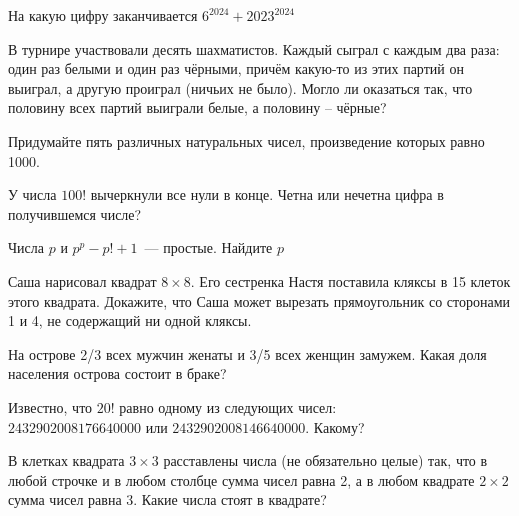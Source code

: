\documentclass{article}
\begin{document}
\begin{enumerate_boxed}
        \item На какую цифру заканчивается $6^{2024} + 2023^{2024}$

        \item В турнире участвовали десять шахматистов.
        Каждый сыграл с каждым два раза: один раз белыми и один раз чёрными, причём какую-то из этих партий он выиграл, а другую проиграл (ничьих не было).
        Могло ли оказаться так, что половину всех партий выиграли белые, а половину – чёрные?

        \item Придумайте пять различных натуральных чисел, произведение которых равно 1000.

        \item У числа $100!$ вычеркнули все нули в конце.
        Четна или нечетна цифра в получившемся числе?

        \item Числа $p$ и $p^p - p! + 1$~--- простые.
        Найдите $p$

        \item Саша нарисовал квадрат $8\times 8$.
        Его сестренка Настя поставила кляксы в 15 клеток этого квадрата.
        Докажите, что Саша может вырезать прямоугольник со сторонами 1 и 4, не содержащий ни одной кляксы.

        \item На острове 2/3 всех мужчин женаты и 3/5 всех женщин замужем.
        Какая доля населения острова состоит в браке?

        \item Известно, что $20!$ равно одному из следующих чисел: \\
        $2432902008176640000$ или $2432902008146640000$.
        Какому?

        \item В клетках квадрата $3 \times 3$ расставлены числа (не обязательно целые) так, что в любой строчке и в любом столбце сумма чисел равна 2, а в любом квадрате $2 \times 2$ сумма чисел равна 3.
        Какие числа стоят в квадрате?


    \end{enumerate_boxed}
\end{document}
